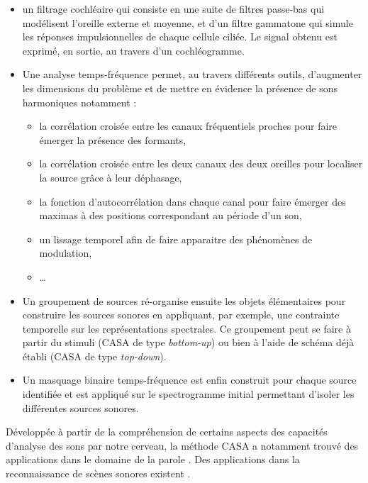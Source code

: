 \begin{itemize}
\item un filtrage cochléaire qui consiste en une suite de filtres passe-bas qui modélisent l'oreille externe et moyenne, et d'un filtre gammatone qui simule les réponses impulsionnelles de chaque cellule ciliée. Le signal obtenu est exprimé, en sortie, au travers d'un cochléogramme.
\item Une analyse temps-fréquence permet, au travers différents outils, d'augmenter les dimensions du problème et de mettre en évidence la présence de sons harmoniques notamment :
\begin{itemize}[label=$\bullet$]
\item la corrélation croisée entre les canaux fréquentiels proches pour faire émerger la présence des formants,
\item la corrélation croisée entre les deux canaux des deux oreilles pour localiser la source grâce à leur déphasage,
\item la fonction d'autocorrélation dans chaque canal pour faire émerger des maximas à des positions correspondant au période d'un son,
\item un lissage temporel afin de faire apparaitre des phénomènes de modulation,
\item \dots
\end{itemize}
\item Un groupement de sources ré-organise ensuite les objets élémentaires pour construire les sources sonores en appliquant, par exemple, une contrainte temporelle  sur les représentations spectrales. Ce groupement peut se faire à partir du stimuli (CASA de type \textit{bottom-up}) ou bien à l'aide de schéma déjà établi (CASA de type \textit{top-down}).
\item Un masquage binaire temps-fréquence est enfin construit pour chaque source identifiée et est appliqué sur le spectrogramme initial permettant d'isoler les différentes sources sonores.\\
\end{itemize}

Développée à partir de la compréhension de certains aspects des capacités d'analyse des sons par notre cerveau, la méthode CASA a notamment trouvé des applications dans le domaine de la parole \cite{ellis1999using, brown2005separation, shao2010computational}. Des applications dans la reconnaissance de scènes sonores existent \cite{peltonen2002computational}. %

